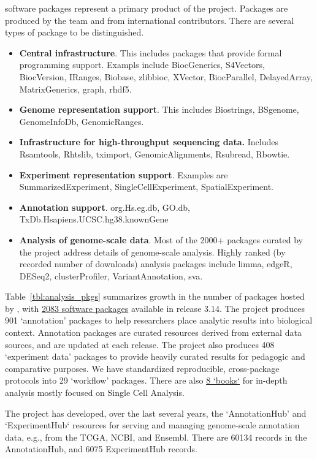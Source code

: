 \documentclass[letterpaper]{article}
\begin{document}
\R{} software packages represent a primary product of the
\Bioconductor{} project. Packages are produced by the \Bioconductor{}
team and from international
contributors.  There are several types of package to be distinguished.

\begin{itemize}
\item \textbf{Central infrastructure}.  This includes packages that
provide formal programming support.
Exampls include
BiocGenerics,
S4Vectors,
BiocVersion,
IRanges,
Biobase,
zlibbioc,
XVector,
BiocParallel,
DelayedArray,
MatrixGenerics, graph, rhdf5.
\item \textbf{Genome representation support}.  This includes
Biostrings, BSgenome, GenomeInfoDb, GenomicRanges.
\item \textbf{Infrastructure for high-throughput sequencing data.}
Includes Rsamtools, Rhtslib, tximport, GenomicAlignments, Rsubread, Rbowtie.
\item \textbf{Experiment representation support}.  Examples are
SummarizedExperiment, SingleCellExperiment, SpatialExperiment.
\item \textbf{Annotation support}.
org.Hs.eg.db, GO.db, TxDb.Hsapiens.UCSC.hg38.knownGene
\item \textbf{Analysis of genome-scale data}.  Most of the 2000+
packages curated by the project address details of genome-scale
analysis.  Highly ranked (by recorded number of downloads)  
analysis packages include limma, edgeR, DESeq2, clusterProfiler, VariantAnnotation, sva.
\end{itemize}

Table~\ref{tbl:analysis_pkgs} summarizes growth in the
number of packages hosted by \Bioconductor{}, with
\href{https://bioconductor.org/packages/3.14}{2083 software packages}
available in release 3.14.  The project produces 901 `annotation'
packages to help researchers place analytic results into biological
context. Annotation packages are curated resources derived from
external data sources, and are updated at each release. The project
also produces 408 `experiment data' packages to provide heavily
curated results for pedagogic and comparative purposes. We have
standardized reproducible, cross-package protocols into 29 `workflow'
packages. There are also
\href{http://bioconductor.org/checkResults/3.14/books-LATEST/}{8 `books`} for
in-depth analysis mostly focused on Single Cell Analysis.


The project has developed, over the last several years, the
`AnnotationHub' and `ExperimentHub` resources for serving and managing
genome-scale annotation data, e.g., from the TCGA, NCBI, and
Ensembl. There are 60134 records in the AnnotationHub, and 6075
ExperimentHub records.
\end{document}
